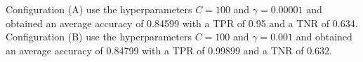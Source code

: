Configuration (A) use the hyperparameters $C = 100$ and $\gamma = 0.00001$
and obtained an average accuracy of 0.84599 with a \gls{TPR} of 0.95 and a
\gls{TNR} of 0.634. Configuration (B) use the hyperparameters $C = 100$ and
$\gamma = 0.001$ and obtained an average accuracy of 0.84799 with a \gls{TPR}
of 0.99899 and a \gls{TNR} of 0.632.
